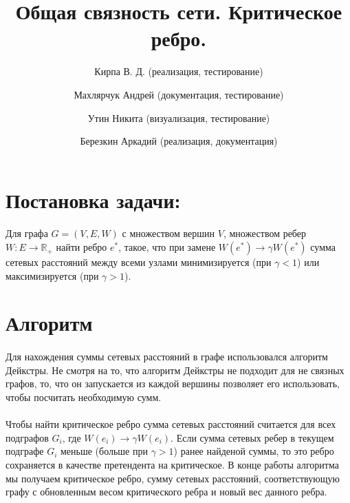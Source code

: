 \documentclass[12pt]{article}
\begin{document}
\title{Общая связность сети. Критическое ребро.}

\author{
  Кирпа В. Д. (реализация, тестирование)
  \and
  Махлярчук Андрей (документация, тестирование)
  \and
  Утин Никита (визуализация, тестирование)
  \and
  Березкин Аркадий (реализация, документация)
}

\maketitle
\thispagestyle{empty}
\newpage



\newpage

\section{Постановка задачи:}

\paragraph{}
Для графа $G = (V, E, W)$ с множеством вершин $V$,
множеством ребер $W: E \rightarrow \mathbb{R}_+$
найти ребро $e^*$, такое, что при замене
$W(e^*) \rightarrow \gamma W(e^*)$ сумма сетевых 
расстояний между всеми узлами минимизируется
(при $\gamma < 1$) или максимизируется (при $\gamma > 1$).

\section{Алгоритм}

\paragraph{}
Для нахождения суммы сетевых расстояний в графе использовался
алгоритм Дейкстры\cite{dijkstra}. Не смотря на то, что алгоритм
Дейкстры не подходит для не связных графов, то, что он запускается
из каждой вершины позволяет его использовать, чтобы посчитать необходимую сумм.

\paragraph{}
Чтобы найти критическое ребро сумма сетевых расстояний считается
для всех подграфов $G_i$, где $W(e_i) \rightarrow \gamma W(e_i)$. Если сумма сетевых
ребер в текущем подграфе $G_i$ меньше (больше при $\gamma > 1$)
ранее найденой суммы, то это ребро сохраняется в качестве претендента
на критическое. В конце работы алгоритма мы получаем критическое ребро, 
сумму сетевых расстояний, соответствующую графу с обновленным весом критического ребра и новый вес данного ребра.
\end{document}
